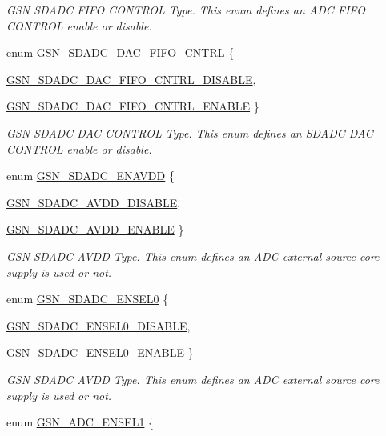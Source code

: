 \begin{DoxyCompactItemize}
\begin{DoxyCompactList}\small\item\em GSN SDADC FIFO CONTROL Type. This enum defines an ADC FIFO CONTROL enable or disable. \end{DoxyCompactList}\item 
enum \hyperlink{a00652_ga3309e966fa4f0d2d297dae6a3bed9599}{GSN\_\-SDADC\_\-DAC\_\-FIFO\_\-CNTRL} \{ \par
\hyperlink{a00652_gga3309e966fa4f0d2d297dae6a3bed9599a7b4646d1784a530487178eecfefaef40}{GSN\_\-SDADC\_\-DAC\_\-FIFO\_\-CNTRL\_\-DISABLE}, 
\par
\hyperlink{a00652_gga3309e966fa4f0d2d297dae6a3bed9599a2f3f695f476584ffb2194191bf43b6ee}{GSN\_\-SDADC\_\-DAC\_\-FIFO\_\-CNTRL\_\-ENABLE}
 \}
\begin{DoxyCompactList}\small\item\em GSN SDADC DAC CONTROL Type. This enum defines an SDADC DAC CONTROL enable or disable. \end{DoxyCompactList}\item 
enum \hyperlink{a00652_gadec6c3ec131e3065cf2061534dfdb320}{GSN\_\-SDADC\_\-ENAVDD} \{ \par
\hyperlink{a00652_ggadec6c3ec131e3065cf2061534dfdb320ae124138038d5451c1ab715007e04a3de}{GSN\_\-SDADC\_\-AVDD\_\-DISABLE}, 
\par
\hyperlink{a00652_ggadec6c3ec131e3065cf2061534dfdb320a296e895cfc98a59cc7db1267ea1ac740}{GSN\_\-SDADC\_\-AVDD\_\-ENABLE}
 \}
\begin{DoxyCompactList}\small\item\em GSN SDADC AVDD Type. This enum defines an ADC external source core supply is used or not. \end{DoxyCompactList}\item 
enum \hyperlink{a00652_ga6258977695af5f9fbae5edbdc75d8387}{GSN\_\-SDADC\_\-ENSEL0} \{ \par
\hyperlink{a00652_gga6258977695af5f9fbae5edbdc75d8387ab2910f640d0e35d0f2bd00c6dba7adc2}{GSN\_\-SDADC\_\-ENSEL0\_\-DISABLE}, 
\par
\hyperlink{a00652_gga6258977695af5f9fbae5edbdc75d8387a8ce1af0f3cd79de783d7e860d70ad54f}{GSN\_\-SDADC\_\-ENSEL0\_\-ENABLE}
 \}
\begin{DoxyCompactList}\small\item\em GSN SDADC AVDD Type. This enum defines an ADC external source core supply is used or not. \end{DoxyCompactList}\item 
enum \hyperlink{a00652_ga7c8cd0e1bbc6163fd01b12c7f31f0550}{GSN\_\-ADC\_\-ENSEL1} \{ \par

\end{DoxyCompactItemize}
